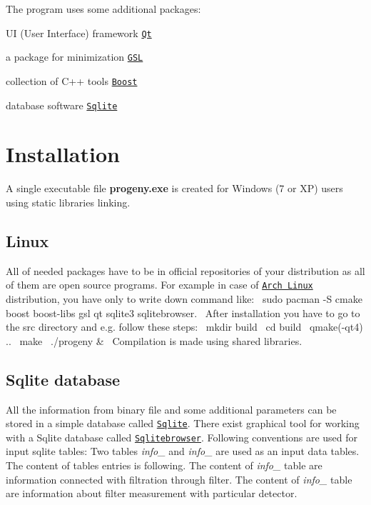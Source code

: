 The program uses some additional packages\+:
\begin{DoxyItemize}
\item U\+I (User Interface) framework \href{http://qt-project.org/}{\tt Qt}
\item a package for minimization \href{http://www.gnu.org/software/gsl/}{\tt G\+S\+L}
\item collection of {\ttfamily C++} tools \href{http://www.boost.org/}{\tt Boost}
\item database software \href{http://www.sqlite.org}{\tt Sqlite}
\end{DoxyItemize}\hypertarget{index_Installation}{}\section{Installation}\label{index_Installation}
A single executable file {\bfseries progeny.\+exe} is created for Windows (7 or X\+P) users using static libraries linking. \hypertarget{index_Linux}{}\subsection{Linux}\label{index_Linux}
All of needed packages have to be in official repositories of your distribution as all of them are open source programs. For example in case of \href{https://www.archlinux.org/}{\tt Arch Linux} distribution, you have only to write down command like\+:~\newline
 {\ttfamily sudo pacman -\/\+S cmake boost boost-\/libs gsl qt sqlite3 sqlitebrowser}.~\newline
 After installation you have to go to the src directory and e.\+g. follow these steps\+:~\newline
 {\ttfamily  mkdir build~\newline
 cd build~\newline
 qmake(-\/qt4) ..~\newline
 make~\newline
 ./progeny \&~\newline
 } Compilation is made using shared libraries.\hypertarget{index_sql_win}{}\subsection{Sqlite database}\label{index_sql_win}
All the information from binary file and some additional parameters can be stored in a simple database called \href{http://www.sqlite.org}{\tt Sqlite}. There exist graphical tool for working with a Sqlite database called \href{https://github.com/sqlitebrowser/sqlitebrowser}{\tt Sqlitebrowser}. Following conventions are used for input sqlite tables\+: Two tables {\itshape info\+\_} and {\itshape info\+\_} are used as an input data tables. The content of tables entries is following. The content of {\itshape info\+\_} table are information connected with filtration through filter. The content of {\itshape info\+\_} table are information about filter measurement with particular detector.
